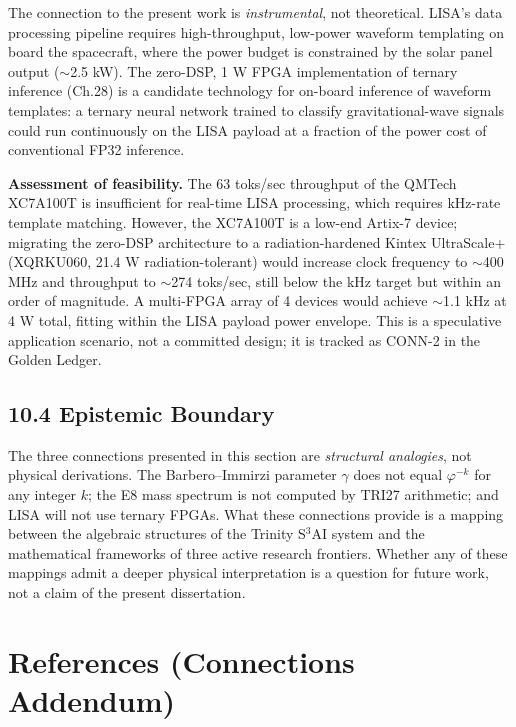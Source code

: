 The connection to the present work is \emph{instrumental}, not
theoretical. LISA's data processing pipeline requires high-throughput,
low-power waveform templating on board the spacecraft, where the power
budget is constrained by the solar panel output ($\sim$2.5 kW). The
zero-DSP, 1 W FPGA implementation of ternary inference (Ch.28) is a
candidate technology for on-board inference of waveform templates: a
ternary neural network trained to classify gravitational-wave signals
could run continuously on the LISA payload at a fraction of the power
cost of conventional FP32 inference.

\textbf{Assessment of feasibility.} The 63 toks/sec throughput of the
QMTech XC7A100T is insufficient for real-time LISA processing, which
requires kHz-rate template matching. However, the XC7A100T is a
low-end Artix-7 device; migrating the zero-DSP architecture to a
radiation-hardened Kintex UltraScale+ (XQRKU060, 21.4 W radiation-tolerant)
would increase clock frequency to $\sim$400 MHz and throughput to
$\sim$274 toks/sec, still below the kHz target but within an order of
magnitude. A multi-FPGA array of 4 devices would achieve $\sim$1.1
kHz at 4 W total, fitting within the LISA payload power envelope. This
is a speculative application scenario, not a committed design; it is
tracked as CONN-2 in the Golden Ledger.

\subsection{10.4 Epistemic Boundary}\label{fa_27:sec:epistemic-boundary}

The three connections presented in this section are \emph{structural
analogies}, not physical derivations. The Barbero--Immirzi parameter
$\gamma$ does not equal $\varphi^{-k}$ for any integer $k$; the E8
mass spectrum is not computed by TRI27 arithmetic; and LISA will not use
ternary FPGAs. What these connections provide is a mapping between the
algebraic structures of the Trinity S$^3$AI system and the mathematical
frameworks of three active research frontiers. Whether any of these
mappings admit a deeper physical interpretation is a question for future
work, not a claim of the present dissertation.

\section{References (Connections
Addendum)}\label{fa_27:references-connections}

